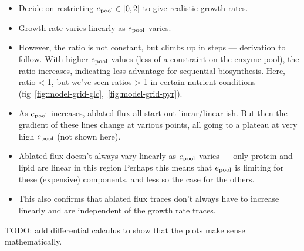 \begin{itemize}
  \item Decide on restricting $e_{\mathrm{pool}} \in [0, 2]$ to give realistic growth rates.
  \item Growth rate varies linearly as $e_{\mathrm{pool}}$ varies.
  \item However, the ratio is not constant, but climbs up in steps --- derivation to follow.
        With higher $e_{\mathrm{pool}}$ values (less of a constraint on the enzyme pool), the ratio increases, indicating less advantage for sequential biosynthesis.
        Here, ratio < 1, but we've seen ratios > 1 in certain nutrient conditions (fig~\ref{fig:model-grid-glc},~\ref{fig:model-grid-pyr}).
  \item As $e_{\mathrm{pool}}$ increases, ablated flux all start out linear/linear-ish.
        But then the gradient of these lines change at various points, all going to a plateau at very high $e_{\mathrm{pool}}$ (not shown here).
  \item Ablated flux doesn't always vary linearly as $e_{\mathrm{pool}}$ varies --- only protein and lipid are linear in this region
        Perhaps this means that $e_{\mathrm{pool}}$ is limiting for these (expensive) components, and less so the case for the others.
  \item This also confirms that ablated flux traces don't always have to increase linearly and are independent of the growth rate traces.
\end{itemize}

TODO: add differential calculus to show that the plots make sense mathematically.

